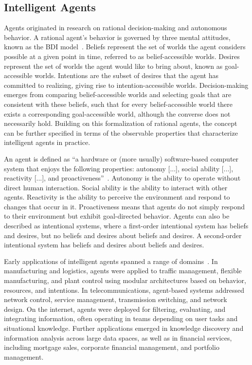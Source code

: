 \documentclass[
english,                 %
bibtex,                  %
includeExtraAbstracts, %
]{kththesis}
\numberwithin{listing}{chapter}
\begin{document}
\subsection{Intelligent Agents}

Agents originated in research on rational decision-making and autonomous behavior. A rational agent’s behavior is governed by three mental attitudes, known as the \gls{BDI} model~\cite{rao_modeling_1991}. Beliefs represent the set of worlds the agent considers possible at a given point in time, referred to as belief-accessible worlds. Desires represent the set of worlds the agent would like to bring about, known as goal-accessible worlds. Intentions are the subset of desires that the agent has committed to realizing, giving rise to intention-accessible worlds. Decision-making emerges from comparing belief-accessible worlds and selecting goals that are consistent with these beliefs, such that for every belief-accessible world there exists a corresponding goal-accessible world, although the converse does not necessarily hold. Building on this formalization of rational agents, the concept can be further specified in terms of the observable properties that characterize intelligent agents in practice.

An agent is defined as ``a hardware or (more usually) software-based computer system that enjoys the following properties: autonomy [...], social ability [...], reactivity [...], and proactiveness''~\cite{wooldridge_intelligent_1995}. Autonomy is the ability to operate without direct human interaction. Social ability is the ability to interact with other agents. Reactivity is the ability to perceive the environment and respond to changes that occur in it. Proactiveness means that agents do not simply respond to their environment but exhibit goal-directed behavior. Agents can also be described as intentional systems, where a first-order intentional system has beliefs and desires, but no beliefs and desires about beliefs and desires. A second-order intentional system has beliefs and desires about beliefs and desires.

Early applications of intelligent agents spanned a range of domains~\cite{jennings_applications_1998}. In manufacturing and logistics, agents were applied to traffic management, flexible manufacturing, and plant control using modular architectures based on behavior, resources, and intentions. In telecommunications, agent-based systems addressed network control, service management, transmission switching, and network design. On the internet, agents were deployed for filtering, evaluating, and integrating information, often operating in teams depending on user tasks and situational knowledge. Further applications emerged in knowledge discovery and information analysis across large data spaces, as well as in financial services, including mortgage sales, corporate financial management, and portfolio management.
\end{document}
